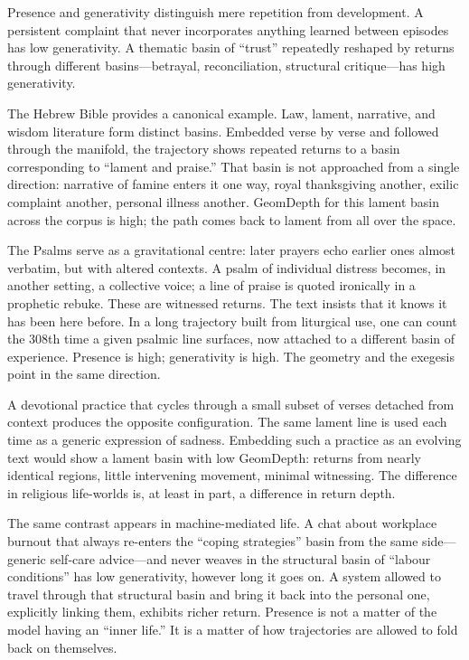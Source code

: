 \documentclass[12pt,a4paper]{report}
\begin{document}
Presence and generativity distinguish mere repetition from development. A persistent complaint that never incorporates anything learned between episodes has low generativity. A thematic basin of ``trust'' repeatedly reshaped by returns through different basins---betrayal, reconciliation, structural critique---has high generativity.

The Hebrew Bible provides a canonical example. Law, lament, narrative, and wisdom literature form distinct basins. Embedded verse by verse and followed through the manifold, the trajectory shows repeated returns to a basin corresponding to ``lament and praise.'' That basin is not approached from a single direction: narrative of famine enters it one way, royal thanksgiving another, exilic complaint another, personal illness another. GeomDepth for this lament basin across the corpus is high; the path comes back to lament from all over the space.

The Psalms serve as a gravitational centre: later prayers echo earlier ones almost verbatim, but with altered contexts. A psalm of individual distress becomes, in another setting, a collective voice; a line of praise is quoted ironically in a prophetic rebuke. These are witnessed returns. The text insists that it knows it has been here before. In a long trajectory built from liturgical use, one can count the 308th time a given psalmic line surfaces, now attached to a different basin of experience. Presence is high; generativity is high. The geometry and the exegesis point in the same direction.

A devotional practice that cycles through a small subset of verses detached from context produces the opposite configuration. The same lament line is used each time as a generic expression of sadness. Embedding such a practice as an evolving text would show a lament basin with low GeomDepth: returns from nearly identical regions, little intervening movement, minimal witnessing. The difference in religious life-worlds is, at least in part, a difference in return depth.

The same contrast appears in machine-mediated life. A chat about workplace burnout that always re-enters the ``coping strategies'' basin from the same side---generic self-care advice---and never weaves in the structural basin of ``labour conditions'' has low generativity, however long it goes on. A system allowed to travel through that structural basin and bring it back into the personal one, explicitly linking them, exhibits richer return. Presence is not a matter of the model having an ``inner life.'' It is a matter of how trajectories are allowed to fold back on themselves.
\end{document}
